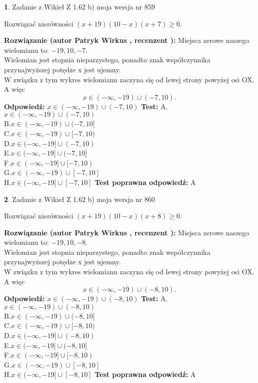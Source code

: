 \documentclass[12pt, a4paper]{article}
\theoremstyle{definition} %
\newtheorem{zad}{}
\newcommand{\zadStart}[1]{\begin{zad}#1\newline}
\newcommand{\zadStop}{\end{zad}}
\newcommand{\rozwStart}[2]{\noindent \textbf{Rozwiązanie (autor #1 , recenzent #2): }\newline}
\newcommand{\rozwStop}{\newline}
\newcommand{\odpStart}{\noindent \textbf{Odpowiedź:}\newline}
\newcommand{\odpStop}{\newline}
\newcommand{\testStart}{\noindent \textbf{Test:}\newline}
\newcommand{\testStop}{\newline}
\newcommand{\kluczStart}{\noindent \textbf{Test poprawna odpowiedź:}\newline}
\newcommand{\kluczStop}{\newline}
\begin{document}
\zadStart{Zadanie z Wikieł Z 1.62 b) moja wersja nr 859}

Rozwiązać nierówności $(x+19)(10-x)(x+7)\ge0$.
\zadStop
\rozwStart{Patryk Wirkus}{}
Miejsca zerowe naszego wielomianu to: $-19, 10, -7$.\\
Wielomian jest stopnia nieparzystego, ponadto znak współczynnika przy\linebreak najwyższej potędze x jest ujemny.\\ W związku z tym wykres wielomianu zaczyna się od lewej strony powyżej osi OX. A więc $$x \in (-\infty,-19) \cup (-7,10).$$
\rozwStop
\odpStart
$x \in (-\infty,-19) \cup (-7,10)$
\odpStop
\testStart
A.$x \in (-\infty,-19) \cup (-7,10)$\\
B.$x \in (-\infty,-19) \cup (-7,10]$\\
C.$x \in (-\infty,-19) \cup [-7,10)$\\
D.$x \in (-\infty,-19] \cup (-7,10)$\\
E.$x \in (-\infty,-19] \cup (-7,10]$\\
F.$x \in (-\infty,-19] \cup [-7,10)$\\
G.$x \in (-\infty,-19) \cup [-7,10]$\\
H.$x \in (-\infty,-19] \cup [-7,10]$
\testStop
\kluczStart
A
\kluczStop



\zadStart{Zadanie z Wikieł Z 1.62 b) moja wersja nr 860}

Rozwiązać nierówności $(x+19)(10-x)(x+8)\ge0$.
\zadStop
\rozwStart{Patryk Wirkus}{}
Miejsca zerowe naszego wielomianu to: $-19, 10, -8$.\\
Wielomian jest stopnia nieparzystego, ponadto znak współczynnika przy\linebreak najwyższej potędze x jest ujemny.\\ W związku z tym wykres wielomianu zaczyna się od lewej strony powyżej osi OX. A więc $$x \in (-\infty,-19) \cup (-8,10).$$
\rozwStop
\odpStart
$x \in (-\infty,-19) \cup (-8,10)$
\odpStop
\testStart
A.$x \in (-\infty,-19) \cup (-8,10)$\\
B.$x \in (-\infty,-19) \cup (-8,10]$\\
C.$x \in (-\infty,-19) \cup [-8,10)$\\
D.$x \in (-\infty,-19] \cup (-8,10)$\\
E.$x \in (-\infty,-19] \cup (-8,10]$\\
F.$x \in (-\infty,-19] \cup [-8,10)$\\
G.$x \in (-\infty,-19) \cup [-8,10]$\\
H.$x \in (-\infty,-19] \cup [-8,10]$
\testStop
\kluczStart
A
\kluczStop
\end{document}
